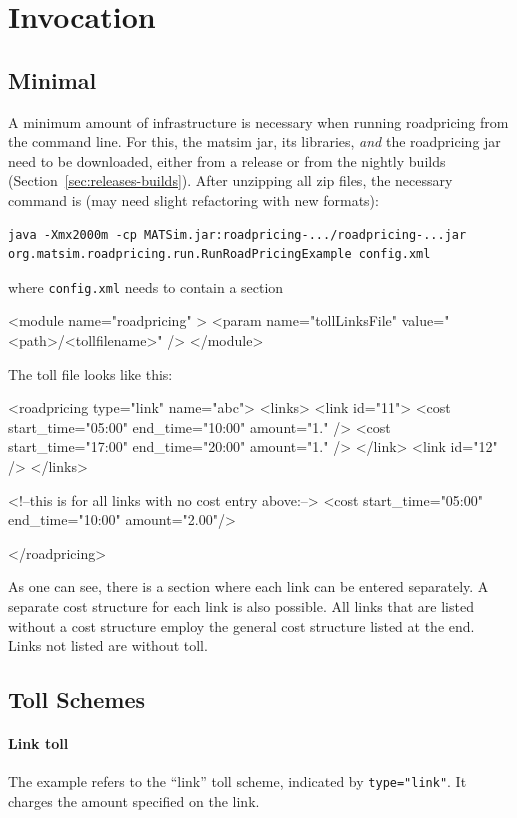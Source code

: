 \section{Invocation}
\subsection{Minimal}
A minimum amount of infrastructure is necessary when running roadpricing from the command line. For this, the \gls{matsim} \gls{jar}, its libraries, \emph{and} the roadpricing \gls{jar} need to be downloaded, either from a release or from the nightly builds (Section~\ref{sec:releases-builds}). After unzipping all zip files, the necessary command is (may need slight refactoring with new formats):
\begin{lstlisting}
java -Xmx2000m -cp MATSim.jar:roadpricing-.../roadpricing-...jar org.matsim.roadpricing.run.RunRoadPricingExample config.xml  
\end{lstlisting}
where \lstinline$config.xml$ needs to contain a section
\begin{xml}
	<module name="roadpricing" >
		<param name="tollLinksFile" value="<path>/<tollfilename>" />
	</module>
\end{xml}
The toll file looks like this:
%
\begin{xml}
<roadpricing type="link" name="abc">
   <links>
      <link id="11">
         <cost start_time="05:00" end_time="10:00" amount="1." />
         <cost start_time="17:00" end_time="20:00" amount="1." />
      </link>             
      <link id="12" />
   </links>

   <!--this is for all links with no cost entry above:-->
   <cost start_time="05:00" end_time="10:00" amount="2.00"/>

</roadpricing>
\end{xml}
%
As one can see, there is a section where each link can be entered separately. A separate cost structure for each link is also possible. All links that are listed without a cost structure employ the general cost structure listed at the end. Links not listed are without toll.

\subsection{Toll Schemes}
\paragraph{Link toll} The example refers to the ``link'' toll scheme, indicated by \lstinline$type="link"$. It charges the amount specified on the link.

